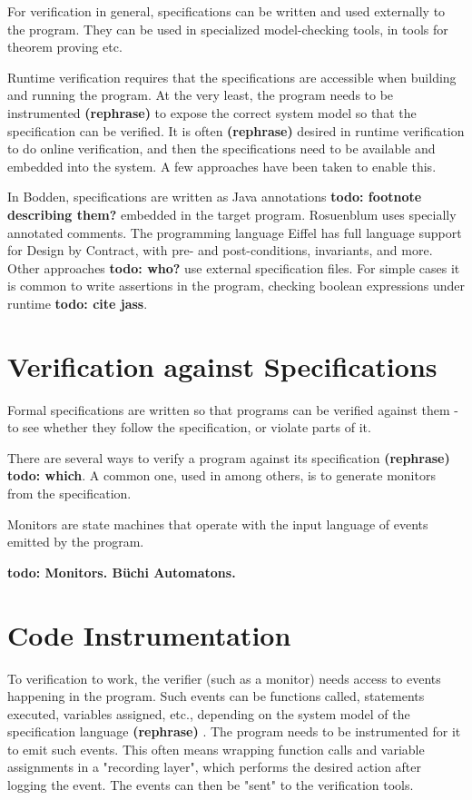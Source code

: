 \documentclass[a4paper,11pt]{kth-mag}
\newcommand{\todo}[1]{\textbf{todo: #1}}
\newcommand{\rephrase}{\textbf{(rephrase)} }
\begin{document}
For verification in general, specifications can be written and used externally to the program. They
can be used in specialized model-checking tools, in tools for theorem proving etc.

Runtime verification requires that the specifications are accessible when building and running the program. At the very least, the program needs to be instrumented \rephrase to expose the
correct system model so that the specification can be verified. It is often \rephrase desired in runtime verification to do online verification, and then the specifications need to be available and
embedded into the system. A few approaches have been taken to enable this.

In Bodden, specifications are written as Java annotations \todo{footnote describing them?} embedded
in the target program. Rosuenblum \cite{rosenblum95practicalassertions} uses specially annotated
comments. The programming language Eiffel has full language support for Design by Contract, with
pre- and post-conditions, invariants, and more. Other approaches \todo{who?} use external specification files. For simple cases it is common to write assertions in the program, checking
boolean expressions under runtime \todo{cite jass}.


\section{Verification against Specifications}

Formal specifications are written so that programs can be verified against them - to see whether
they follow the specification, or violate parts of it.

There are several ways to verify a program against its specification \rephrase \todo{which}. A common
one, used in \cite{bauer06monitoring,bodden05efficientrv} among others, is to generate monitors
from the specification.

Monitors are state machines that operate with the input language of events emitted by the program.

\todo{Monitors. Büchi Automatons.}

\section{Code Instrumentation}

To verification to work, the verifier (such as a monitor) needs access to events happening in the
program. Such events can be functions called, statements executed, variables assigned, etc., depending on the system model of the specification language \rephrase. The program needs to be instrumented for it to emit such events. This often means wrapping function calls and variable assignments in a "recording layer", which performs the desired action after logging the event.
The events can then be "sent" to the verification tools.
\end{document}
